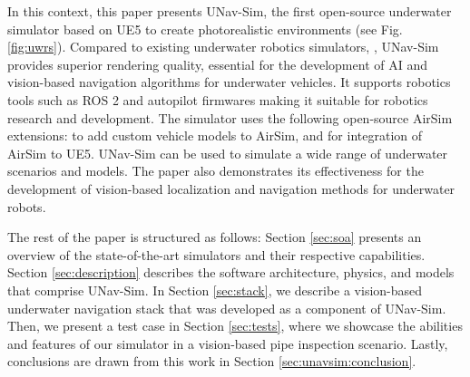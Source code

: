In this context, this paper presents UNav-Sim, the first open-source underwater simulator based on \ac{UE5} to create photorealistic environments (see Fig. \ref{fig:uwrs}). Compared to existing underwater robotics simulators, \cite{holoocean,uuv,projectdave,marus}, UNav-Sim provides superior rendering quality, essential for the development of \ac{AI} and vision-based navigation algorithms for underwater vehicles. It supports robotics tools such as ROS 2 and autopilot firmwares making it suitable for robotics research and development. The simulator uses the following open-source AirSim \cite{rw:shah2018airsim} extensions: \cite{byu_vtol} to add custom vehicle models to AirSim, and \cite{coles} for integration of AirSim to \ac{UE5}. UNav-Sim can be used to simulate a wide range of underwater scenarios and models. The paper also demonstrates its effectiveness for the development of vision-based localization and navigation methods for underwater robots. 

The rest of the paper is structured as follows: Section \ref{sec:soa} presents an overview of the state-of-the-art simulators and their respective capabilities. Section \ref{sec:description} describes the software architecture, physics, and models that comprise UNav-Sim. In Section \ref{sec:stack}, we describe a vision-based underwater navigation stack that was developed as a component of UNav-Sim. Then, we present a test case in Section \ref{sec:tests}, where we showcase the abilities and features of our simulator in a vision-based pipe inspection scenario. Lastly, conclusions are drawn from this work in Section \ref{sec:unavsim:conclusion}.

